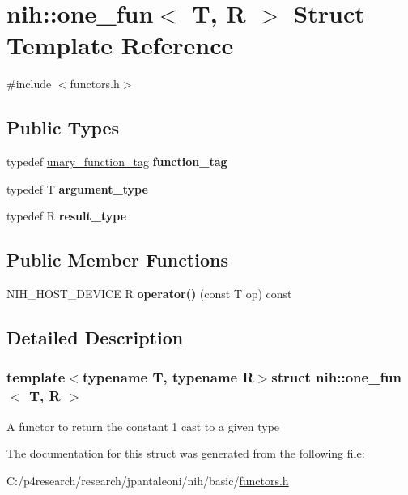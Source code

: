 \hypertarget{structnih_1_1one__fun}{
\section{nih\-:\-:one\-\_\-fun$<$ \-T, \-R $>$ \-Struct \-Template \-Reference}
\label{structnih_1_1one__fun}
}


{\ttfamily \#include $<$functors.\-h$>$}

\subsection*{\-Public \-Types}
\begin{DoxyCompactItemize}
\item 
\hypertarget{structnih_1_1one__fun_ad389b85134617af5bde779da643303a2}{
typedef \hyperlink{structnih_1_1unary__function__tag}{unary\-\_\-function\-\_\-tag} {\bfseries function\-\_\-tag}}
\label{structnih_1_1one__fun_ad389b85134617af5bde779da643303a2}

\item 
\hypertarget{structnih_1_1one__fun_a15ca2d4b6e51c53917277871144b8355}{
typedef \-T {\bfseries argument\-\_\-type}}
\label{structnih_1_1one__fun_a15ca2d4b6e51c53917277871144b8355}

\item 
\hypertarget{structnih_1_1one__fun_abf9b769d82d7a710c458fd5a6358b1f0}{
typedef \-R {\bfseries result\-\_\-type}}
\label{structnih_1_1one__fun_abf9b769d82d7a710c458fd5a6358b1f0}

\end{DoxyCompactItemize}
\subsection*{\-Public \-Member \-Functions}
\begin{DoxyCompactItemize}
\item 
\hypertarget{structnih_1_1one__fun_a51e01d64b94f7fe96c2e5dbb27a1c499}{
\-N\-I\-H\-\_\-\-H\-O\-S\-T\-\_\-\-D\-E\-V\-I\-C\-E \-R {\bfseries operator()} (const \-T op) const }
\label{structnih_1_1one__fun_a51e01d64b94f7fe96c2e5dbb27a1c499}

\end{DoxyCompactItemize}


\subsection{\-Detailed \-Description}
\subsubsection*{template$<$typename T, typename R$>$struct nih\-::one\-\_\-fun$<$ T, R $>$}

\-A functor to return the constant 1 cast to a given type 

\-The documentation for this struct was generated from the following file\-:\begin{DoxyCompactItemize}
\item 
\-C\-:/p4research/research/jpantaleoni/nih/basic/\hyperlink{functors_8h}{functors.\-h}\end{DoxyCompactItemize}
